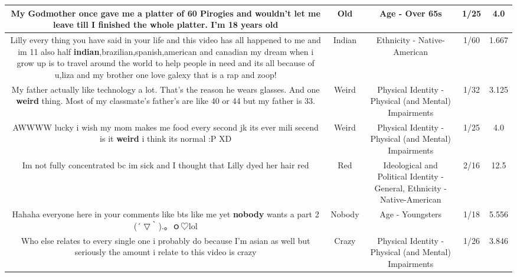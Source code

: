 \documentclass[11pt]{article}
\newlength\mylength
\begin{document}
\begin{center}
\begin{longtable}{|C{.65\mylength}|C{.30\mylength}|C{.12\mylength}|C{.12\mylength}|C{.12\mylength}|}
  \small My Godmother once gave me a platter of 60 Pirogies and wouldn't let me leave till I finished the whole platter. I'm 18 years old\normalsize   & Old & Age - Over 65s & 1/25 & 4.0 \\  \hline
  \small Lilly every thing you have said in your life and this video has all happened to me and im 11 also half \textbf{indian},brazilian,spanish,american and canadian my dream when i grow up is to travel around the world to help people in need and its all because of u,liza and my brother one love galexy that is a rap and zoop!\normalsize   & Indian & Ethnicity - Native-American & 1/60 & 1.667 \\  \hline
  \small My father actually like technology a lot. That's the reason he wears glasses. And one \textbf{weird} thing. Most of my classmate's father's are like 40 or 44 but my father is 33.\normalsize   & Weird & Physical Identity - Physical (and Mental) Impairments & 1/32 & 3.125 \\  \hline
  \small AWWWW lucky i wish my mom makes me food every second jk its ever mili secend is it \textbf{weird} i think its normal :P XD\normalsize   & Weird & Physical Identity - Physical (and Mental) Impairments & 1/25 & 4.0 \\  \hline
  \small Im not fully concentrated bc im sick and I thought that Lilly dyed her hair red\normalsize   & Red &  Ideological and Political Identity - General, Ethnicity - Native-American & 2/16 & 12.5 \\  \hline
  \small Hahaha everyone  here in your comments like bts  like me yet \textbf{nobody} wants a part 2 (´ ▽｀).。ｏ♡lol\normalsize   & Nobody & Age - Youngsters & 1/18 & 5.556 \\  \hline
  \small Who else relates to every single one i probably do because I'm asian as well but seriously the amount i relate to this video is crazy\normalsize   & Crazy & Physical Identity - Physical (and Mental) Impairments & 1/26 & 3.846 \\  \hline

\end{longtable}
\end{center}
\end{document}
